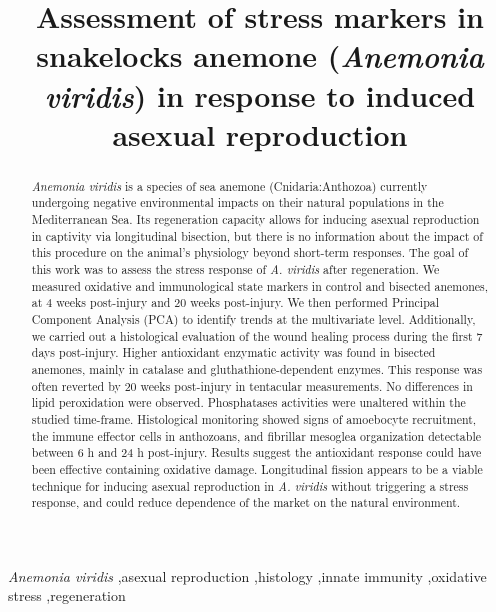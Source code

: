 \documentclass[final,3p,times,authoryear]{elsarticle}
\begin{document}
\begin{frontmatter}
\title{Assessment of stress markers in snakelocks anemone (\textit{Anemonia viridis}) in response to induced asexual reproduction} %

\begin{abstract}
\textit{Anemonia viridis} is a species of sea anemone (Cnidaria:Anthozoa) currently undergoing negative environmental impacts on their natural populations in the Mediterranean Sea. Its regeneration capacity allows for inducing asexual reproduction in captivity via longitudinal bisection, but there is no information about the impact of this procedure on the animal's physiology beyond short-term responses. The goal of this work was to assess the stress response of \textit{A. viridis} after regeneration. We measured oxidative and immunological state markers in control and bisected anemones, at 4 weeks post-injury and 20 weeks post-injury. We then performed Principal Component Analysis (PCA) to identify trends at the multivariate level. Additionally, we carried out a histological evaluation of the wound healing process during the first 7 days post-injury. Higher antioxidant enzymatic activity was found in bisected anemones, mainly in catalase and gluthathione-dependent enzymes. This response was often reverted by 20 weeks post-injury in tentacular measurements. No differences in lipid peroxidation were observed. Phosphatases activities were unaltered within the studied time-frame. Histological monitoring showed signs of amoebocyte recruitment, the immune effector cells in anthozoans, and fibrillar mesoglea organization detectable between 6 h and 24 h post-injury. Results suggest the antioxidant response could have been effective containing oxidative damage. Longitudinal fission appears to be a viable technique for inducing asexual reproduction in \textit{A. viridis} without triggering a stress response, and could reduce dependence of the market on the natural environment.

\end{abstract}

\begin{keyword}
\textit{Anemonia viridis} \sep asexual reproduction \sep histology \sep innate immunity \sep oxidative stress \sep regeneration
\end{keyword}

\end{frontmatter}

\end{document}
